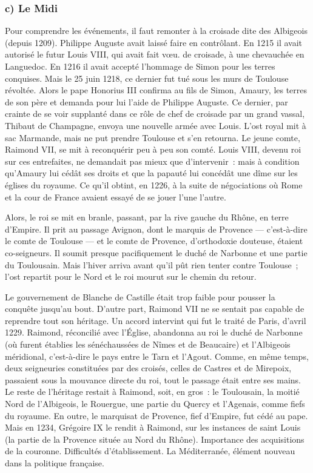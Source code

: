 \documentclass[french,twoside]{book} %
\begin{document}
\subsubsection[{c) Le Midi}]{c) Le Midi}
\noindent Pour comprendre les événements, il faut remonter à la croisade dite des Albigeois (depuis 1209). Philippe Auguste avait laissé faire en contrôlant. En 1215 il avait autorisé le futur Louis VIII, qui avait fait vœu. de croisade, à une chevauchée en Languedoc. En 1216 il avait accepté l’hommage de Simon pour les terres conquises. Mais le 25 juin 1218, ce dernier fut tué sous les murs de Toulouse révoltée. Alors le pape Honorius III confirma au fils de Simon, Amaury, les terres de son père et demanda pour lui l’aide de Philippe Auguste. Ce dernier, par crainte de se voir supplanté dans ce rôle de chef de croisade par un grand vassal, Thibaut de Champagne, envoya une nouvelle armée avec Louis. L’ost royal mit à sac Marmande, mais ne put prendre Toulouse et s’en retourna. Le jeune comte, Raimond VII, se mit à reconquérir peu à peu son comté. Louis VIII, devenu roi sur ces entrefaites, ne demandait pas mieux que d’intervenir : mais à condition qu’Amaury lui cédât ses droits et que la papauté lui concédât une dîme sur les églises du royaume. Ce qu’il obtint, en 1226, à la suite de négociations où Rome et la cour de France avaient essayé de se jouer l’une l’autre.\par
Alors, le roi se mit en branle, passant, par la rive gauche du Rhône, en terre d’Empire. Il prit au passage Avignon, dont le marquis de Provence — c’est-à-dire le comte de Toulouse — et le comte de Provence, d’orthodoxie douteuse, étaient co-seigneurs. Il soumit presque pacifiquement le duché de Narbonne et une partie du Toulousain. Mais l’hiver arriva avant qu’il pût rien tenter contre Toulouse ; l’ost repartit pour le Nord et le roi mourut sur le chemin du retour.\par
Le gouvernement de Blanche de Castille était trop faible pour pousser la conquête jusqu’au bout. D’autre part, Raimond VII ne se sentait pas capable de reprendre tout son héritage. Un accord intervint qui fut le traité de Paris, d’avril 1229. Raimond, réconcilié avec l’Église, abandonna au roi le duché de Narbonne (où furent établies les sénéchaussées de Nîmes et de Beaucaire) et l’Albigeois méridional, c’est-à-dire le pays entre le Tarn et l’Agout. Comme, en  
\label{p27} même temps, deux seigneuries constituées par des croisés, celles de Castres et de Mirepoix, passaient sous la mouvance directe du roi, tout le passage était entre ses mains. Le reste de l’héritage restait à Raimond, soit, en gros : le Toulousain, la moitié Nord de l’Albigeois, le Rouergue, une partie du Quercy et l’Agenais, comme fiefs du royaume. En outre, le marquisat de Provence, fief d’Empire, fut cédé au pape. Mais en 1234, Grégoire IX le rendit à Raimond, sur les instances de saint Louis (la partie de la Provence située au Nord du Rhône). Importance des acquisitions de la couronne. Difficultés d’établissement. La Méditerranée, élément nouveau dans la politique française.\par
\end{document}
